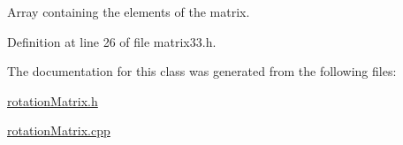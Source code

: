 Array containing the elements of the matrix. 



Definition at line 26 of file matrix33.\-h.



The documentation for this class was generated from the following files\-:\begin{DoxyCompactItemize}
\item 
\hyperlink{rotationMatrix_8h}{rotation\-Matrix.\-h}\item 
\hyperlink{rotationMatrix_8cpp}{rotation\-Matrix.\-cpp}\end{DoxyCompactItemize}
